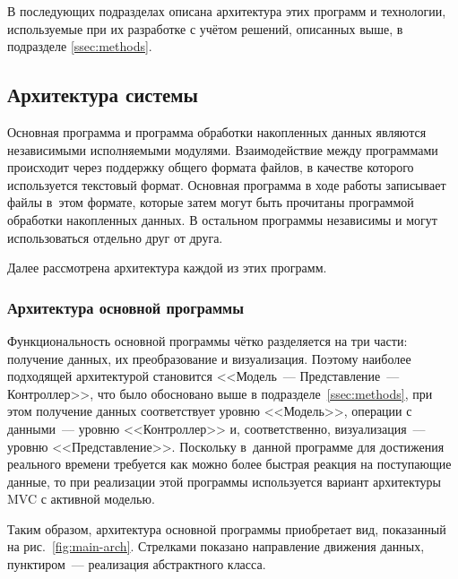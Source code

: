 \documentclass[a4paper, 14pt, titlepage]{extarticle}
\begin{document}
  В последующих подразделах описана архитектура этих программ и технологии, используемые при их
  разработке с учётом решений, описанных выше, в подразделе \ref{ssec:methods}.

  \subsection{Архитектура системы}\label{ssec:arch}

  Основная программа и программа обработки накопленных данных являются независимыми исполняемыми
  модулями. Взаимодействие между программами происходит через поддержку общего формата файлов, в
  качестве которого используется текстовый формат.
  Основная программа в ходе работы записывает файлы в~этом формате, которые затем могут быть прочитаны
  программой обработки накопленных данных. В остальном программы независимы и могут использоваться
  отдельно друг от друга.

  Далее рассмотрена архитектура каждой из этих программ.

  \subsubsection{Архитектура основной программы}\label{sssec:main-arch}

  Функциональность основной программы чётко разделяется на три части: получение данных, их
  преобразование и визуализация. Поэтому наиболее подходящей архитектурой становится <<Модель~---
  Представление~--- Контроллер>>, что было обосновано выше в подразделе~\ref{ssec:methods}, при этом
  получение данных соответствует уровню <<Модель>>, операции с данными~--- уровню <<Контроллер>> и,
  соответственно, визуализация~--- уровню <<Представление>>.  Поскольку в~данной программе для
  достижения реального времени требуется как можно более быстрая реакция на поступающие данные, то
  при реализации этой программы используется вариант архитектуры MVC с активной моделью.

  Таким образом, архитектура основной программы приобретает вид, показанный на рис.~\ref{fig:main-arch}.
  Стрелками показано направление движения данных, пунктиром~--- реализация абстрактного класса.
\end{document}
